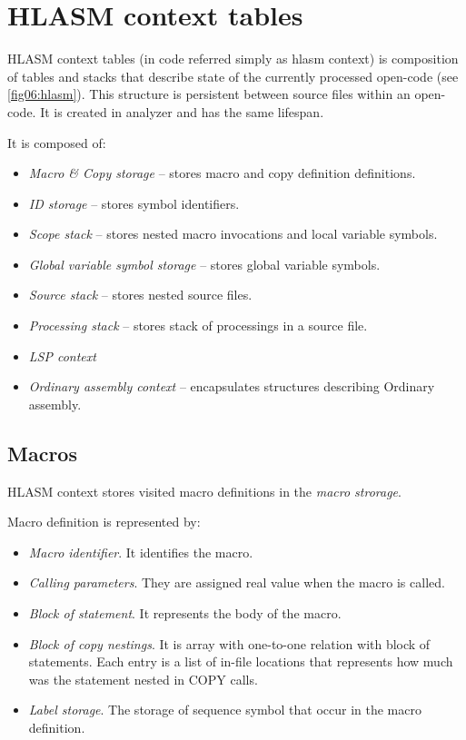 \section{HLASM context tables}

HLASM context tables (in code referred simply as hlasm context) is composition of tables and stacks that describe state of the currently processed open-code (see \cref{fig06:hlasm}). This structure is persistent between source files within an open-code. It is created in analyzer and has the same lifespan. 

It is composed of:

\begin{itemize}
	\item \emph{Macro \& Copy storage} -- stores macro and copy definition definitions.
	\item \emph{ID storage} -- stores symbol identifiers.
	\item \emph{Scope stack} -- stores nested macro invocations and local variable symbols.
	\item \emph{Global variable symbol storage} -- stores global variable symbols.
	\item \emph{Source stack} -- stores nested source files.
	\item \emph{Processing stack} -- stores stack of processings in a source file.
	\item \emph{LSP context}
	\item \emph{Ordinary assembly context} -- encapsulates structures describing Ordinary assembly.
\end{itemize}

\subsection{Macros}

HLASM context stores visited macro definitions in the \emph{macro strorage}. 

Macro definition is represented by:
\begin{itemize}
	\item \emph{Macro identifier}. It identifies the macro.
	\item \emph{Calling parameters}. They are assigned real value when the macro is called.
	\item \emph{Block of statement}. It represents the body of the macro.
	\item \emph{Block of copy nestings}. It is array with one-to-one relation with block of statements. Each entry is a list of in-file locations that represents how much was the statement nested in COPY calls.
	\item \emph{Label storage}. The storage of sequence symbol that occur in the macro definition.
\end{itemize}

